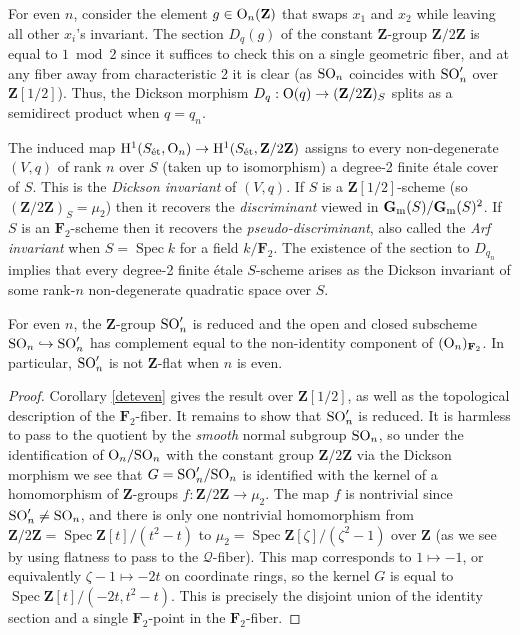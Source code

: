 \documentclass[10pt]{article}
\newcommand{\Q}{\mathscr{Q}}
\newcommand{\FF}{\mathbf{F}}
\newcommand{\et}{{\rm{\acute{e}t}}}
\renewcommand{\(}{\left(}
\renewcommand{\)}{\right)}
\newcommand{\Spec}{\operatorname{Spec}}
\numberwithin{thm}{subsection}
\begin{document}
\begin{rem}\label{dflat}
For even $n$, consider the element $g \in {\rm{O}}_n({\mathbf{Z}})$
that swaps $x_1$ and $x_2$
while leaving all other $x_i$'s invariant. The section
$D_q(g)$ of the constant ${\mathbf{Z}}$-group ${\mathbf{Z}}/2{\mathbf{Z}}$ is equal to $1 \bmod 2$
since it suffices to check this on a single geometric fiber,
and at any fiber away from characteristic 2 it is clear
(as ${\rm{SO}}_n$ coincides with ${\rm{SO}}'_n$
over ${\mathbf{Z}}[1/2]$).
Thus, the Dickson morphism $D_q: {\rm{O}}(q) \rightarrow ({\mathbf{Z}}/2{\mathbf{Z}})_S$ splits
as a semidirect product when $q = q_n$.

The induced map 
${\rm{H}}^1(S_{\et}, {\rm{O}}_n) \rightarrow 
{\rm{H}}^1(S_{\et},{\mathbf{Z}}/2{\mathbf{Z}})$ assigns to every non-degenerate $(V,q)$ of rank $n$ over $S$
(taken up to isomorphism)
a degree-2 finite \'etale cover of $S$.  This is the {\em Dickson invariant}
of $(V,q)$.  If $S$ is a ${\mathbf{Z}}[1/2]$-scheme (so $({\mathbf{Z}}/2{\mathbf{Z}})_S = \mu_2$)
then it recovers the {\em discriminant} viewed in ${\mathbf{G}}_{\rm{m}}(S)/{\mathbf{G}}_{\rm{m}}(S)^2$.
If $S$ is an $\FF_2$-scheme then it recovers the {\em pseudo-discriminant},
also called the {\em Arf invariant} when $S = \Spec k$ for a field $k/\FF_2$. 
The existence of the section to $D_{q_n}$
implies that every degree-2 finite \'etale $S$-scheme arises as the Dickson invariant of 
some rank-$n$ non-degenerate quadratic space over $S$.
\end{rem}




\begin{cor}\label{naive}
For even $n$, the ${\mathbf{Z}}$-group
${\rm{SO}}'_n$ is reduced
and the open and closed subscheme ${\rm{SO}}_n \hookrightarrow {\rm{SO}}'_n$
has complement
equal to the non-identity component of $({\rm{O}}_n)_{\FF_2}$.
In particular, ${\rm{SO}}'_n$ is not ${\mathbf{Z}}$-flat when $n$ is even.
\end{cor}

\begin{proof}
Corollary \ref{deteven} gives the result over ${\mathbf{Z}}[1/2]$,
as well as the topological description of the $\FF_2$-fiber.
It remains to show that ${\rm{SO}}'_n$ is reduced. 
It is harmless to pass to the quotient by the {\em smooth}
normal subgroup ${\rm{SO}}_n$, so under the
identification of ${\rm{O}}_n/{\rm{SO}}_n$ with the constant
group ${\mathbf{Z}}/2{\mathbf{Z}}$ via the Dickson morphism
we see that $G = {\rm{SO}}'_n/{\rm{SO}}_n$ is identified
with the kernel of a homomorphism of ${\mathbf{Z}}$-groups
$f:{\mathbf{Z}}/2{\mathbf{Z}} \rightarrow \mu_2$.  The map
$f$ is nontrivial since ${\rm{SO}}'_n \ne {\rm{SO}}_n$,
and there is only one nontrivial homomorphism
from ${\mathbf{Z}}/2{\mathbf{Z}} = \Spec {\mathbf{Z}}[t]/(t^2 - t)$ to $\mu_2 = \Spec {\mathbf{Z}}[\zeta]/(\zeta^2 - 1)$ 
over ${\mathbf{Z}}$ (as we see by using flatness
to pass to the $\Q$-fiber).   This map
corresponds to $1 \mapsto -1$, 
or equivalently $\zeta - 1 \mapsto -2t$ on coordinate rings, 
so the kernel $G$ is equal to $\Spec {\mathbf{Z}}[t]/(-2t, t^2 - t)$.
This is precisely the disjoint union of the identity section
and a single $\FF_2$-point in the $\FF_2$-fiber.
\end{proof}
\end{document}
